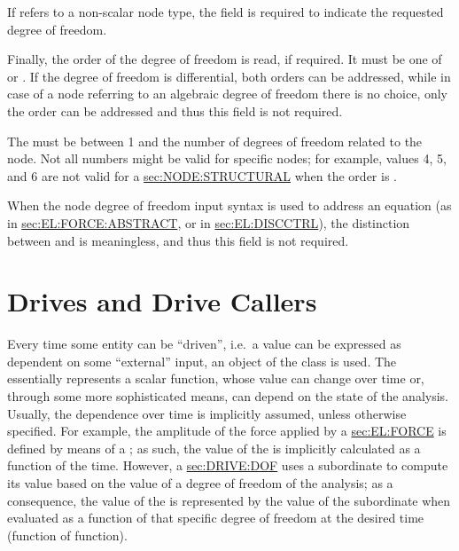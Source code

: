 If  refers to a non-scalar node type,
the  field is required to indicate the requested
degree of freedom.

Finally, the order of the degree of freedom is read, if required.
It must be one of  or .
If the  degree of freedom is differential, both
orders can be addressed, while in case of a node referring
to an algebraic degree of freedom there is no choice,
only the  order can be addressed and thus this field
is not required.

The  must be between 1 and the number of degrees of freedom
related to the node.
Not all numbers might be valid for specific nodes; for example,
 values 4, 5, and 6 are not valid for a
\hyperref{\kw{structural node}}{\kw{structural node}, Section~}{}{sec:NODE:STRUCTURAL} when the order is .

When the node degree of freedom input syntax is used to address
an equation (as in
\hyperref{\kw{abstract} force elements}{\kw{abstract} force elements, Section~}{}{sec:EL:FORCE:ABSTRACT},
or in
\hyperref{\kw{discrete control} elements}{\kw{discrete control} elements, Section~}{}{sec:EL:DISCCTRL}),
the distinction between  and  is meaningless,
and thus this field is not required.




\section{Drives and Drive Callers}\label{sec:DRIVE}
Every time some entity can be ``driven'', i.e.\ a value can be
expressed as dependent on some ``external'' input, an object of the class 
 is used. 
The  essentially represents a scalar function, whose
value can change over time or, through some more sophisticated
means, can depend on the state of the analysis.
Usually, the dependence over time is implicitly assumed, unless
otherwise specified.
For example, the amplitude of the force applied by a 
\hyperref{\kw{force} element}{\kw{force} element (see Section~}{)}{sec:EL:FORCE}
is defined by means of a ; as such, the value of the  
is implicitly calculated as a function of the time.
However, a 
\hyperref{\kw{dof drive}}{\kw{dof drive} (see Section~}{)}{sec:DRIVE:DOF}
uses a subordinate  to compute its value based on the value
of a degree of freedom of the analysis; as a consequence,
the value of the  is represented by the
value of the subordinate  when evaluated as a function
of that specific degree of freedom at the desired time (function of function).

